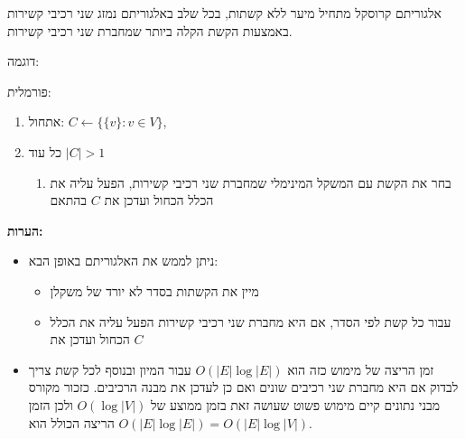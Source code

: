 אלגוריתם קרוסקל מתחיל מיער ללא קשתות, בכל שלב באלגוריתם נמזג שני רכיבי קשירות באמצעות
הקשת הקלה ביותר שמחברת שני רכיבי קשירות.

דוגמה:

\begin{center}
\end{center}

פורמלית:
\begin{enumerate}
\item
אתחול:
$C \leftarrow \{\{v\} : v \in V \}$, 
\item
כל עוד 
$|C| > 1$
\begin{enumerate}
\item
בחר את הקשת עם המשקל המינימלי שמחברת שני רכיבי קשירות, הפעל עליה את הכלל הכחול ועדכן 
את $C$ בהתאם
\end{enumerate}
\end{enumerate}

\textbf{הערות:}
\begin{itemize}
\item
ניתן לממש את האלגוריתם באופן הבא:
\begin{itemize}
\item
מיין את הקשתות בסדר לא יורד של משקלן
\item
עבור כל קשת לפי הסדר, אם היא מחברת שני רכיבי קשירות הפעל עליה את הכלל הכחול ועדכן את $C$
\end{itemize}
\item
זמן הריצה של מימוש כזה הוא 
$O(|E| \log |E|)$
עבור המיון ובנוסף לכל קשת צריך לבדוק אם היא מחברת שני רכיבים שונים ואם כן לעדכן את מבנה הרכיבים.
כזכור מקורס מבני נתונים קיים מימוש פשוט שעושה זאת בזמן ממוצע של 
$O(\log |V|)$
ולכן הזמן הריצה הכולל הוא 
$O(|E| \log |E|) = O(|E| \log |V|)$.

\end{itemize}
